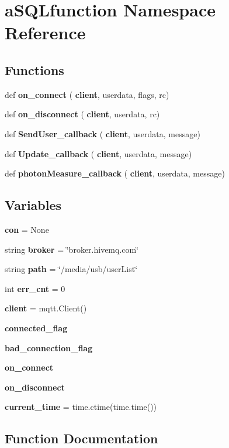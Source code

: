 \section{a\+S\+Q\+Lfunction Namespace Reference}
\label{namespacea_s_q_lfunction}
\subsection*{Functions}
\begin{DoxyCompactItemize}
\item 
def \textbf{ on\+\_\+connect} (\textbf{ client}, userdata, flags, rc)
\item 
def \textbf{ on\+\_\+disconnect} (\textbf{ client}, userdata, rc)
\item 
def \textbf{ Send\+User\+\_\+callback} (\textbf{ client}, userdata, message)
\item 
def \textbf{ Update\+\_\+callback} (\textbf{ client}, userdata, message)
\item 
def \textbf{ photon\+Measure\+\_\+callback} (\textbf{ client}, userdata, message)
\end{DoxyCompactItemize}
\subsection*{Variables}
\begin{DoxyCompactItemize}
\item 
\textbf{ con} = None
\item 
string \textbf{ broker} = \char`\"{}broker.\+hivemq.\+com\char`\"{}
\item 
string \textbf{ path} = \char`\"{}/media/usb/user\+List\char`\"{}
\item 
int \textbf{ err\+\_\+cnt} = 0
\item 
\textbf{ client} = mqtt.\+Client()
\item 
\textbf{ connected\+\_\+flag}
\item 
\textbf{ bad\+\_\+connection\+\_\+flag}
\item 
\textbf{ on\+\_\+connect}
\item 
\textbf{ on\+\_\+disconnect}
\item 
\textbf{ current\+\_\+time} = time.\+ctime(time.\+time())
\end{DoxyCompactItemize}


\subsection{Function Documentation}
\mbox{\label{namespacea_s_q_lfunction_a7da290ce6dcb2117b3d70e6981ec1073}} 
